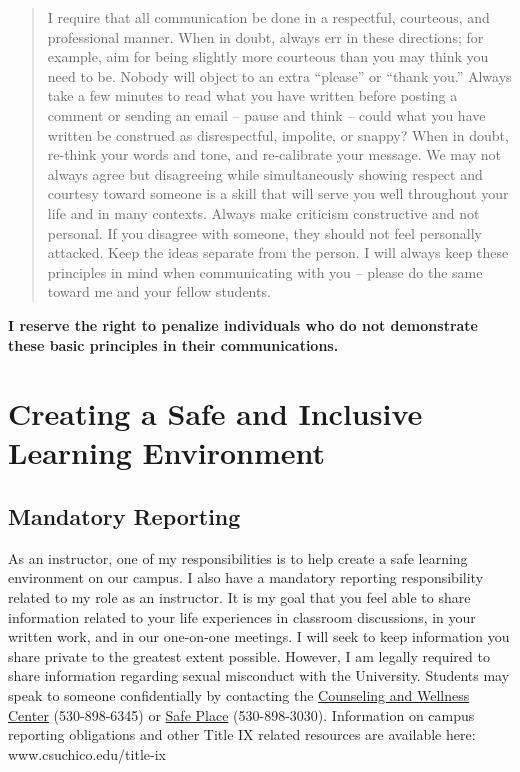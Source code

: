 \documentclass[11pt,]{article}
\begin{document}
\begin{itemize}
  \begin{quote}
  I require that all communication be done in a respectful, courteous,
  and professional manner. When in doubt, always err in these
  directions; for example, aim for being slightly more courteous than
  you may think you need to be. Nobody will object to an extra
  ``please'' or ``thank you.'' Always take a few minutes to read what
  you have written before posting a comment or sending an email -- pause
  and think -- could what you have written be construed as
  disrespectful, impolite, or snappy? When in doubt, re-think your words
  and tone, and re-calibrate your message. We may not always agree but
  disagreeing while simultaneously showing respect and courtesy toward
  someone is a skill that will serve you well throughout your life and
  in many contexts. Always make criticism constructive and not personal.
  If you disagree with someone, they should not feel personally
  attacked. Keep the ideas separate from the person. I will always keep
  these principles in mind when communicating with you -- please do the
  same toward me and your fellow students.
  \end{quote}
\end{itemize}

\textbf{I reserve the right to penalize individuals who do not
demonstrate these basic principles in their communications.}

\hypertarget{creating-a-safe-and-inclusive-learning-environment}{%
\section{Creating a Safe and Inclusive Learning
Environment}\label{creating-a-safe-and-inclusive-learning-environment}}

\hypertarget{mandatory-reporting}{%
\subsection{Mandatory Reporting}\label{mandatory-reporting}}

As an instructor, one of my responsibilities is to help create a safe
learning environment on our campus. I also have a mandatory reporting
responsibility related to my role as an instructor. It is my goal that
you feel able to share information related to your life experiences in
classroom discussions, in your written work, and in our one-on-one
meetings. I will seek to keep information you share private to the
greatest extent possible. However, I am legally required to share
information regarding sexual misconduct with the University. Students
may speak to someone confidentially by contacting the
\href{https://www.csuchico.edu/counseling/}{Counseling and Wellness
Center} (530-898-6345) or
\href{https://www.csuchico.edu/safeplace/}{Safe Place} (530-898-3030).
Information on campus reporting obligations and other Title IX related
resources are available here: www.csuchico.edu/title-ix
\end{document}
